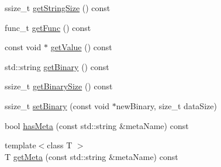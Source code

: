 \begin{DoxyCompactItemize}
\begin{DoxyCompactList}\small\item\em \end{DoxyCompactList}\item 
ssize\-\_\-t \hyperlink{classkdb_1_1Key_af3032a91f0fbf111b6b5e42dd35865db}{get\-String\-Size} () const 
\begin{DoxyCompactList}\small\item\em \end{DoxyCompactList}\item 
func\-\_\-t \hyperlink{classkdb_1_1Key_a9e4f81dae7370976dad75030e8c0d084}{get\-Func} () const 
\item 
const void $\ast$ \hyperlink{classkdb_1_1Key_a3e0bbc6b746b89db7abb73a4cc2fff39}{get\-Value} () const 
\begin{DoxyCompactList}\small\item\em \end{DoxyCompactList}\item 
std\-::string \hyperlink{classkdb_1_1Key_a16b64fd6db0a743e2e4ab08daf6fba73}{get\-Binary} () const 
\begin{DoxyCompactList}\small\item\em \end{DoxyCompactList}\item 
ssize\-\_\-t \hyperlink{classkdb_1_1Key_af173c1c4ab4104c5bc48a98cf011ca8d}{get\-Binary\-Size} () const 
\begin{DoxyCompactList}\small\item\em \end{DoxyCompactList}\item 
ssize\-\_\-t \hyperlink{classkdb_1_1Key_af7211129a4b95f4d1e335dcd06e9bf0a}{set\-Binary} (const void $\ast$new\-Binary, size\-\_\-t data\-Size)
\begin{DoxyCompactList}\small\item\em \end{DoxyCompactList}\item 
bool \hyperlink{classkdb_1_1Key_abb2c472e514ecef5fedb63ecae7c0f54}{has\-Meta} (const std\-::string \&meta\-Name) const 
\item 
{\footnotesize template$<$class T $>$ }\\T \hyperlink{classkdb_1_1Key_a7a4952f9ee22e6787fc9d43507114612}{get\-Meta} (const std\-::string \&meta\-Name) const 
\begin{DoxyCompactList}\small\item\em \end{DoxyCompactList}\item 

\end{DoxyCompactItemize}
